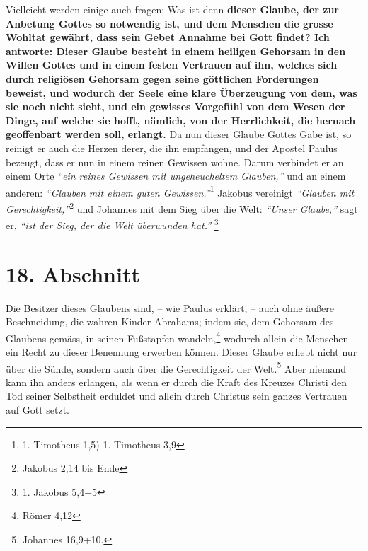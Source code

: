 Vielleicht werden einige auch fragen: Was ist denn \textbf{dieser Glaube, der
zur
Anbetung Gottes so notwendig ist, und dem Menschen die grosse Wohltat gewährt,
dass sein Gebet Annahme bei Gott findet? Ich antworte: Dieser Glaube besteht in
einem heiligen Gehorsam in den Willen Gottes und in einem festen Vertrauen auf
ihn, welches sich durch religiösen Gehorsam gegen
seine göttlichen Forderungen
beweist, und wodurch der Seele eine klare Überzeugung von dem, was sie noch
nicht sieht, und ein gewisses Vorgefühl von dem Wesen der Dinge, auf welche sie
hofft, nämlich, von der Herrlichkeit, die hernach geoffenbart werden soll,
erlangt.} Da nun dieser Glaube Gottes Gabe ist, so reinigt er auch die Herzen
derer, die ihn empfangen, und der Apostel Paulus bezeugt, dass er nun in einem
reinen Gewissen wohne. Darum verbindet er an einem Orte
\textit{"`ein reines Gewissen mit ungeheucheltem Glauben,"'} und an einem
anderen: \textit{"`Glauben mit einem guten
Gewissen."'}\footnote{1. Timotheus 1,5) 1. Timotheus 3,9}
Jakobus vereinigt
\textit{"`Glauben mit Gerechtigkeit,"'}\footnote{Jakobus 2,14 bis Ende}
und Johannes mit dem Sieg über
die Welt:\textit{ "`Unser Glaube,"'} sagt er, \textit{"`ist der Sieg, der die
Welt überwunden hat."'} \footnote{1. Jakobus
5,4+5}

\section{18. Abschnitt} \label{kap6_ab18}

Die Besitzer dieses Glaubens sind, -- wie Paulus erklärt, -- auch ohne äußere
Beschneidung, die wahren Kinder
Abrahams; indem sie, dem Gehorsam des Glaubens
gemäss, in seinen Fußstapfen wandeln,\footnote{Römer 4,12}
wodurch allein die
Menschen ein Recht zu dieser Benennung erwerben können. Dieser Glaube erhebt
nicht nur über die Sünde, sondern auch über die
Gerechtigkeit der Welt.\footnote{Johannes 16,9+10.}
Aber niemand kann ihn anders erlangen, als wenn
er durch die Kraft des Kreuzes Christi den Tod seiner
Selbstheit
erduldet und allein durch Christus sein ganzes Vertrauen auf Gott setzt.

\medskip

